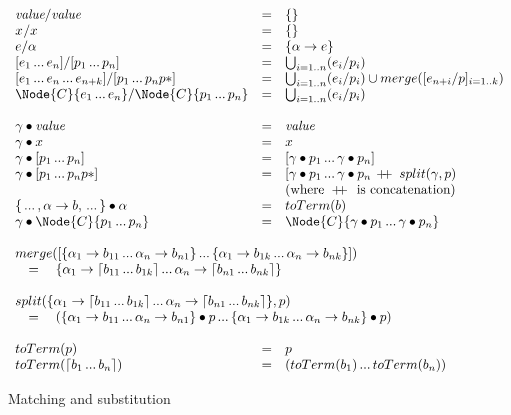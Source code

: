\begin{figure}[t]
\[\begin{array}{lclll}
\Match{\Value}{\Value} &=& \{\} \\
\Match{\VarX}{\VarX} &=& \{\} \\
\Match{e}{\PVarA} &=& \{\PVarA \to e\} \\
\Match{[e_1 \dd e_n]}{[p_1 \dd p_n]} &=&
  \bigcup_{i=1..n} (\Match{e_i}{p_i}) \\
\Match{[e_1 \dd e_n \dd e_{n+k}]}{[p_1 \dd p_n \Ell{p}]} &=&
  \bigcup_{i=1..n} (\Match{e_i}{p_i}) \cup
  merge([\Match{e_{n+i}}{p}]_{i=1..k}) \\
\Match{\Node{C}{e_1 \dd e_n}}{\Node{C}{p_1 \dd p_n}} &=&
  \bigcup_{i=1..n} (\Match{e_i}{p_i}) \\ \\

\Subs{\gamma}{\Value}        &=& \Value \\
\Subs{\gamma}{\VarX}        &=& \VarX \\
\Subs{\gamma}{[p_1 \dd p_n]}    &=& [\Subs{\gamma}{p_1} \dd \Subs{\gamma}{p_n}] \\
\Subs{\gamma}{[p_1 \dd p_n \Ell{p}]} &=&
  [\Subs{\gamma}{p_1} \dd \Subs{\gamma}{p_n\,\DoublePlus\,split(\gamma, p)} \\
    &&\text{(where } \DoublePlus \text{ is concatenation)} \\
\Subs{\{\dd,\PVarA \to b,\dd\}}{\PVarA} &=& toTerm(b) \\
\Subs{\gamma}{\Node{C}{p_1 \dd p_n}} &=&
  \Node{C}{\Subs{\gamma}{p_1} \dd \Subs{\gamma}{p_n}} \\ \\

\multicolumn{3}{l}{merge([\{\PVarA_1 \to b_{11} \dd \PVarA_n \to b_{n1}\}
    \dd \{\PVarA_1 \to b_{1k} \dd \PVarA_n \to b_{nk}\}])} \\
\multicolumn{3}{l}{\quad=\quad \{\PVarA_1 \to \BList{b_{11} \dd b_{1k}} \dd
  \PVarA_n \to \BList{b_{n1} \dd b_{nk}}\}} \\ \\

\multicolumn{3}{l}{split(\{\PVarA_1 \to \BList{b_{11} \dd b_{1k}} \dd 
  \PVarA_n \to \BList{b_{n1} \dd b_{nk}}\}, p)} \\
\multicolumn{3}{l}{\quad=\quad
  (\Subs{\{\PVarA_1 \to b_{11} \dd  \PVarA_n \to b_{n1}\}}{p} \dd 
   \Subs{\{\PVarA_1 \to b_{1k} \dd  \PVarA_n \to b_{nk}\}}{p})} \\ \\

toTerm(p) &=& p \\
toTerm(\BList{b_1 \dd b_n}) &=&
  (toTerm(b_1) \dd toTerm(b_n))

\end{array}\]
\caption{Matching and substitution}
\label{fig:reval-formal-subs}
\end{figure}

